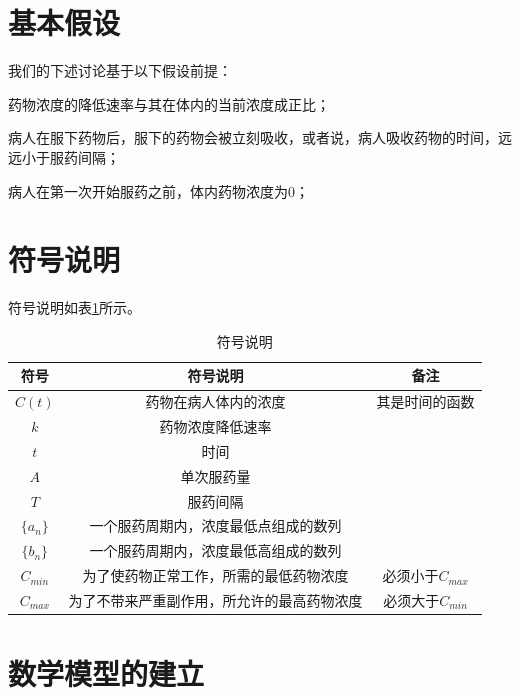 \documentclass[12pt,AutoFakeSlant,AutoFakeBold]{article}
\begin{document}
\section{基本假设}

我们的下述讨论基于以下假设前提：

\begin{itemize*}
    \item 药物浓度的降低速率与其在体内的当前浓度成正比；
    \item 病人在服下药物后，服下的药物会被立刻吸收，或者说，病人吸收药物的时间，远远小于服药间隔；
    \item 病人在第一次开始服药之前，体内药物浓度为0；
\end{itemize*}

\section{符号说明}

符号说明如表\ref{tab:符号说明}所示。

\begin{table}[!ht]
    \centering
    \caption{符号说明}
    \label{tab:符号说明}
    \begin{tabular}{ccc}
        \toprule
        符号 & 符号说明 & 备注 \\ 
        \midrule
        $C(t)$ & 药物在病人体内的浓度      & 其是时间的函数 \\
        $k$    & 药物浓度降低速率          & ~  \\
        $t$    & 时间                     & ~  \\
        $A$    & 单次服药量                & ~  \\
        $T$    & 服药间隔                  & ~  \\
        $\{a_n\}$& 一个服药周期内，浓度最低点组成的数列 & ~ \\
        $\{b_n\}$& 一个服药周期内，浓度最低高组成的数列 & ~ \\
        $C_{min}$ & 为了使药物正常工作，所需的最低药物浓度 & 必须小于$C_{max}$ \\
        $C_{max}$ & 为了不带来严重副作用，所允许的最高药物浓度& 必须大于$C_{min}$
        \\ \bottomrule
    \end{tabular}
\end{table}

\section{数学模型的建立}
\end{document}
